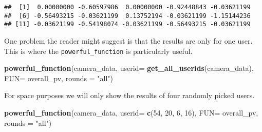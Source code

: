 \documentclass[]{article}
\newenvironment{Shaded}{\begin{snugshade}}{\end{snugshade}}
\newcommand{\KeywordTok}[1]{\textcolor[rgb]{0.13,0.29,0.53}{\textbf{{#1}}}}
\newcommand{\DataTypeTok}[1]{\textcolor[rgb]{0.13,0.29,0.53}{{#1}}}
\newcommand{\DecValTok}[1]{\textcolor[rgb]{0.00,0.00,0.81}{{#1}}}
\newcommand{\StringTok}[1]{\textcolor[rgb]{0.31,0.60,0.02}{{#1}}}
\newcommand{\NormalTok}[1]{{#1}}
\begin{document}
\begin{verbatim}
##  [1]  0.00000000 -0.60597986  0.00000000 -0.92448843 -0.03621199
##  [6] -0.56493215 -0.03621199  0.13752194 -0.03621199 -1.15144236
## [11] -0.03621199 -0.54198074 -0.03621199 -0.56493215 -0.03621199
\end{verbatim}

One problem the reader might suggest is that the results are only for
one user. This is where the \texttt{powerful\_function} is particularly
useful.

\begin{Shaded}
\begin{Highlighting}[]
\KeywordTok{powerful_function}\NormalTok{(camera_data,}
                  \DataTypeTok{userid=} \KeywordTok{get_all_userids}\NormalTok{(camera_data), }
                  \DataTypeTok{FUN=} \NormalTok{overall_pv,}
                  \DataTypeTok{rounds =} \StringTok{"all"}\NormalTok{)}
\end{Highlighting}
\end{Shaded}

For space purposes we will only show the results of four randomly picked
users.

\begin{Shaded}
\begin{Highlighting}[]
\KeywordTok{powerful_function}\NormalTok{(camera_data,}
                  \DataTypeTok{userid=} \KeywordTok{c}\NormalTok{(}\DecValTok{54}\NormalTok{, }\DecValTok{20}\NormalTok{, }\DecValTok{6}\NormalTok{, }\DecValTok{16}\NormalTok{), }
                  \DataTypeTok{FUN=} \NormalTok{overall_pv,}
                  \DataTypeTok{rounds =} \StringTok{"all"}\NormalTok{)}
\end{Highlighting}
\end{Shaded}
\end{document}

